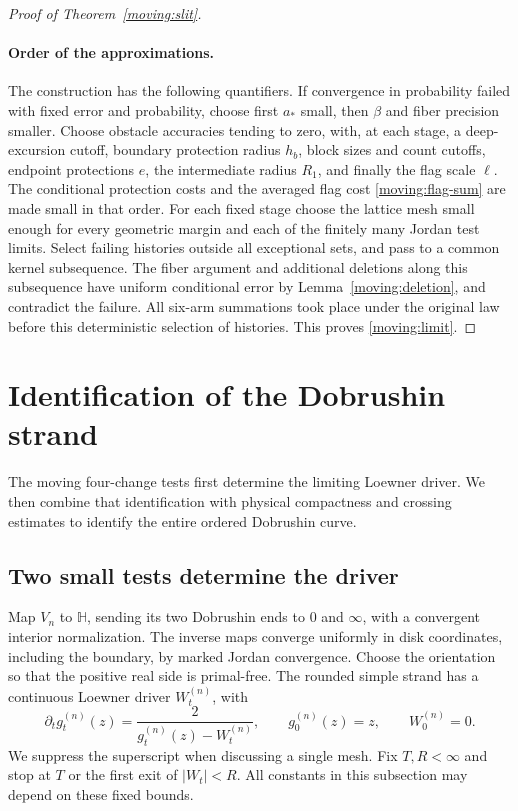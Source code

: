 \begin{proof}[Proof of Theorem~\ref{moving:slit}]
\paragraph{Order of the approximations.}
The construction has the following quantifiers.
If convergence in probability failed with fixed error and probability,
choose first $a_*$ small, then $\beta$ and fiber precision smaller.
Choose obstacle accuracies tending to zero, with, at each stage,
a deep-excursion cutoff, boundary protection radius $h_b$, block
sizes and count cutoffs, endpoint protections $e$, the intermediate
radius $R_1$, and finally the flag scale $\ell$.  The conditional
protection costs and the averaged flag cost
\eqref{moving:flag-sum} are made small in that order.  For each fixed
stage choose the lattice mesh small enough for every geometric margin
and each of the finitely many Jordan test limits.  Select failing
histories outside all exceptional sets, and pass to a common kernel
subsequence.  The fiber argument and additional deletions along this
subsequence have uniform conditional error by
Lemma~\ref{moving:deletion}, and contradict the failure.  All six-arm
summations took place under the original law before this deterministic
selection of histories.  This proves \eqref{moving:limit}.
\end{proof}

\section{Identification of the Dobrushin strand}\label{sec:chordal}

The moving four-change tests first determine the limiting Loewner
driver.  We then combine that identification with physical compactness
and crossing estimates to identify the entire ordered Dobrushin curve.

\subsection{Two small tests determine the driver}

Map $V_n$ to $\mathbb H$, sending its two Dobrushin ends to $0$ and
$\infty$, with a convergent interior normalization.  The inverse maps
converge uniformly in disk coordinates, including the boundary, by
marked Jordan convergence.  Choose the orientation so that the
positive real side is primal-free.  The rounded simple strand has a
continuous Loewner driver $W_t^{(n)}$, with
\begin{equation}\label{chordal:loewner}
 \partial_t g_t^{(n)}(z)=\frac{2}{g_t^{(n)}(z)-W_t^{(n)}},
 \qquad g_0^{(n)}(z)=z,\qquad W_0^{(n)}=0.
\end{equation}
We suppress the superscript when discussing a single mesh.
Fix $T,R<\infty$ and stop at $T$ or the first exit of $|W_t|<R$.
All constants in this subsection may depend on these fixed bounds.

